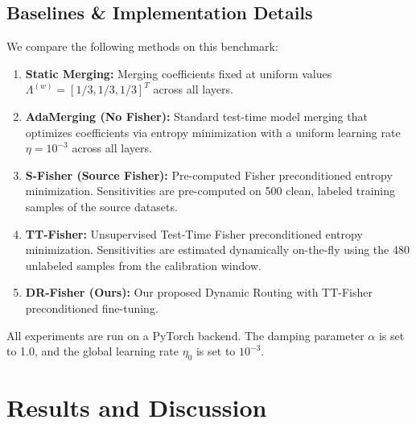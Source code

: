 \documentclass{article}
\theoremstyle{plain}
\theoremstyle{definition}
\theoremstyle{remark}
\begin{document}
\subsection{Baselines \& Implementation Details}
We compare the following methods on this benchmark:
\begin{enumerate}
    \item \textbf{Static Merging:} Merging coefficients fixed at uniform values $\Lambda^{(w)} = [1/3, 1/3, 1/3]^T$ across all layers.
    \item \textbf{AdaMerging (No Fisher):} Standard test-time model merging that optimizes coefficients via entropy minimization with a uniform learning rate $\eta = 10^{-3}$ across all layers.
    \item \textbf{S-Fisher (Source Fisher):} Pre-computed Fisher preconditioned entropy minimization. Sensitivities are pre-computed on 500 clean, labeled training samples of the source datasets.
    \item \textbf{TT-Fisher:} Unsupervised Test-Time Fisher preconditioned entropy minimization. Sensitivities are estimated dynamically on-the-fly using the 480 unlabeled samples from the calibration window.
    \item \textbf{DR-Fisher (Ours):} Our proposed Dynamic Routing with TT-Fisher preconditioned fine-tuning.
\end{enumerate}
All experiments are run on a PyTorch backend. The damping parameter $\alpha$ is set to 1.0, and the global learning rate $\eta_0$ is set to $10^{-3}$.

\section{Results and Discussion}
\label{submission-results}
\end{document}
